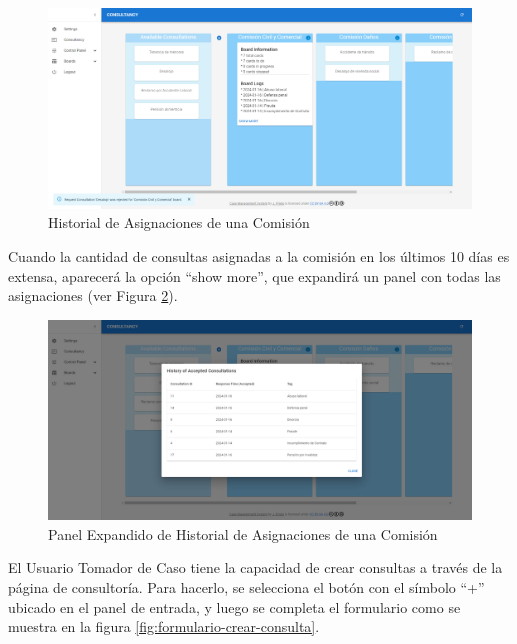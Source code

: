 \begin{figure}[H]
    \centering
    \includegraphics[width=1\linewidth]{fig/consultancy-real-page-logs-1.png}
    \caption{Historial de Asignaciones de una Comisión}
    \label{fig:consultancy-logs-1}
\end{figure}

Cuando la cantidad de consultas asignadas a la comisión en los últimos 10 días es extensa, aparecerá la opción ``show more'', que expandirá un panel con todas las asignaciones (ver Figura \ref{fig:consultancy-logs-2}).

\begin{figure}[H]
    \centering
    \includegraphics[width=1\linewidth]{fig/consultancy-real-page-logs-2.png}
    \caption{Panel Expandido de Historial de Asignaciones de una Comisión}
    \label{fig:consultancy-logs-2}
\end{figure}

El Usuario Tomador de Caso tiene la capacidad de crear consultas a través de la página de consultoría. Para hacerlo, se selecciona el botón con el símbolo ``+'' ubicado en el panel de entrada, y luego se completa el formulario como se muestra en la figura \ref{fig:formulario-crear-consulta}.

